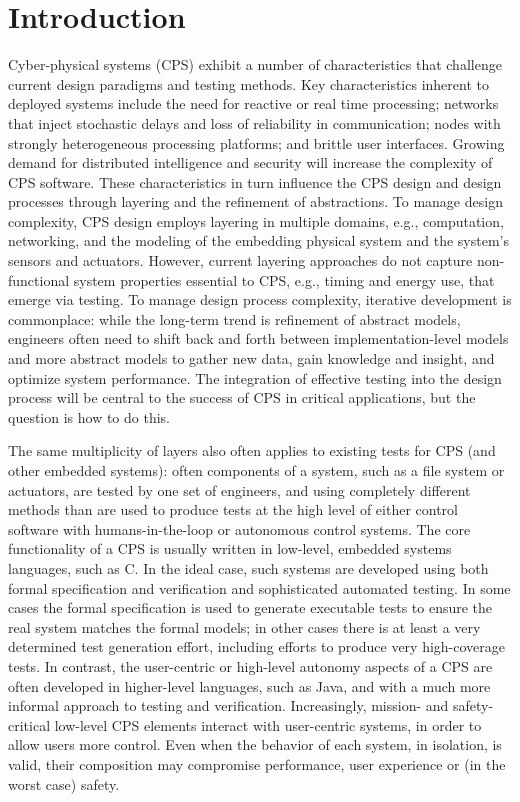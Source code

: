\section{Introduction}

Cyber-physical systems (CPS) exhibit a number of characteristics that challenge current design paradigms and testing methods.  Key characteristics inherent to deployed systems include the need for reactive or real time processing; networks that inject stochastic delays and loss of reliability in communication; nodes with strongly heterogeneous processing platforms; and brittle user interfaces. Growing demand for distributed intelligence and security will increase the complexity of CPS software. These characteristics in turn influence the CPS design and design processes through layering and the refinement of abstractions. To manage design complexity, CPS design employs layering in multiple domains, e.g., computation, networking, and the modeling of the embedding physical system and the system's sensors and actuators. However, current layering approaches do not capture non-functional system properties essential to CPS, e.g., timing and energy use, that emerge via testing.  To manage design process complexity, iterative development is commonplace: while the long-term trend is refinement of abstract models, engineers often need to shift back and forth  between implementation-level models and more abstract models to gather new data, gain knowledge and insight, and optimize system performance.  The integration of effective testing into the design process will be central to the success of CPS in critical applications, but the question is how to do this.

The same multiplicity of layers also often applies to existing tests for CPS (and other embedded systems):  often components of a system, such as a file system or actuators, are tested by one set of engineers, and using completely different methods than are used to produce tests at the high level of either control software with humans-in-the-loop or autonomous control systems.  
The core functionality of a CPS is usually written in low-level, embedded
systems languages, such as C.  In the ideal case, such systems are developed using both formal specification and verification and sophisticated automated
testing.  In some cases the formal specification is used to generate
executable tests to ensure the real system matches the formal models;
in other cases there is at least a very determined test generation
effort, including efforts to produce very high-coverage tests.  In
contrast, the user-centric or high-level autonomy aspects of a CPS are often developed in higher-level
languages, such as Java, and with a much more informal approach to
testing and verification.  Increasingly, mission- and safety-critical low-level CPS elements interact with user-centric systems, in order to allow users more
control.  Even when the behavior of each system, in isolation, is
valid, their composition may compromise performance, user experience or (in
the worst case) safety.


